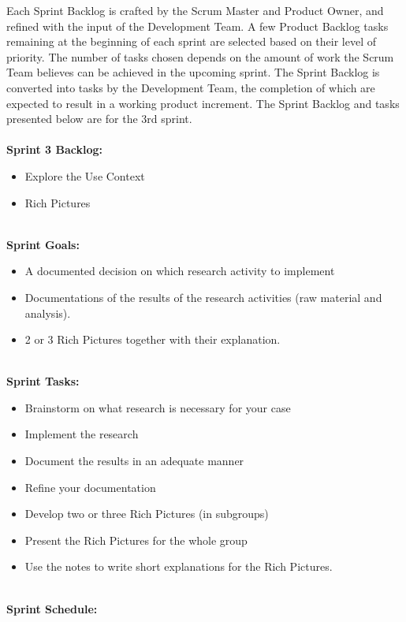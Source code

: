 Each Sprint Backlog is crafted by the Scrum Master and Product Owner, and refined with the input of the Development Team. A few Product Backlog tasks remaining at the beginning of each sprint are selected based on their level of priority. The number of tasks chosen depends on the amount of work the Scrum Team believes can be achieved in the upcoming sprint. The Sprint Backlog is converted into tasks by the Development Team, the completion of which are expected to result in a working product increment. The Sprint Backlog and tasks presented below are for the 3rd sprint.
\ \\ \\
\textbf{Sprint 3 Backlog:}
\begin{itemize}
\item Explore the Use Context
\item Rich Pictures
\end{itemize}
\ \\
\textbf{Sprint Goals:}
\begin{itemize}
\item A documented decision on which research activity to implement
\item Documentations of the results of the research activities (raw material and analysis).
\item 2 or 3 Rich Pictures together with their explanation.
\end{itemize}
\ \\
\textbf{Sprint Tasks:}
\begin{itemize}
\item Brainstorm on what research is necessary for your case
\item Implement the research
\item Document the results in an adequate manner
\item Refine your documentation
\item Develop two or three Rich Pictures (in subgroups)
\item Present the Rich Pictures for the whole group
\item Use the notes to write short explanations for the Rich Pictures.
\end{itemize}
\ \\
\textbf{Sprint Schedule:}
